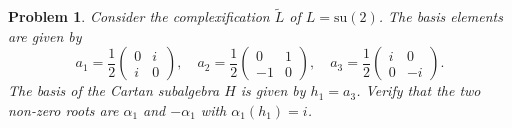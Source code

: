 \documentclass[UTF8,10pt,a4paper]{article}
\theoremstyle{Problem}
\newtheorem{prob}{Problem}
\theoremstyle{Solution}
\begin{document}
\begin{prob}
    Consider the complexification $\tilde{L}$ of $L=\text{su}(2)$. The basis elements are given by
    \[
        a_1=\frac{1}{2}\left(\begin{matrix}
            0&i\\
            i&0
        \end{matrix}\right),\quad a_2=\frac{1}{2}\left(\begin{matrix}
            0&1\\
            -1&0
        \end{matrix}\right),\quad a_3=\frac{1}{2}\left(\begin{matrix}
            i&0\\
            0&-i
        \end{matrix}\right).
    \]
    The basis of the Cartan subalgebra $H$ is given by $h_1=a_3$. Verify that the two non-zero roots are $\alpha_1$ and $-\alpha_1$ with $\alpha_1(h_1)=i$.
\end{prob}
\end{document}
